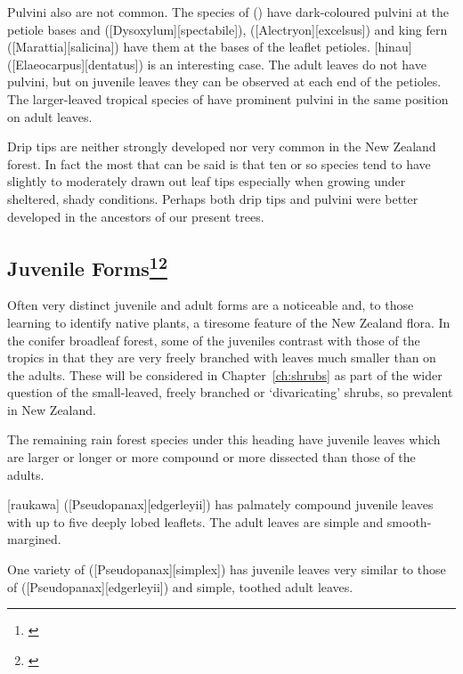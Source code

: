 Pulvini also are not common.
The species of  () have dark-coloured pulvini at the petiole bases and  ([Dysoxylum][spectabile]),  ([Alectryon][excelsus]) and king fern ([Marattia][salicina]) have them at the bases of the leaflet petioles.
[hinau] ([Elaeocarpus][dentatus]) is an interesting case.
The adult leaves do not have pulvini, but on juvenile leaves they can be observed at each end of the petioles.
The larger-leaved tropical species of  have prominent pulvini in the same position on adult leaves.

Drip tips are neither strongly developed nor very common in the New Zealand forest.
In fact the most that can be said is that ten or so species tend to have slightly to moderately drawn out leaf tips especially when growing under sheltered, shady conditions.
Perhaps both drip tips and pulvini were better developed in the ancestors of our present trees.

\subsection[Juvenile Forms]{Juvenile Forms\thinspace\footnote{\cite{godley1985paths}}\footnote{\cite{philipson1964habit}}}

Often very distinct juvenile and adult forms are a noticeable and, to those learning to identify native plants, a tiresome feature of the New Zealand flora.
In the conifer broadleaf forest, some of the juveniles contrast with those of the tropics in that they are very freely branched with leaves much smaller than on the adults.
These will be considered in Chapter~\ref{ch:shrubs}  as part of the wider question of the small-leaved, freely branched or `divaricating' shrubs, so prevalent in New Zealand.

The remaining rain forest species under this heading have juvenile leaves which are larger or longer or more compound or more dissected than those of the adults.

[raukawa] ([Pseudopanax][edgerleyii]) has palmately compound juvenile leaves with up to five deeply lobed leaflets.
The adult leaves are simple and smooth-margined.

One variety of  ([Pseudopanax][simplex]) has juvenile leaves very similar to those of  ([Pseudopanax][edgerleyii]) and simple, toothed adult leaves.

